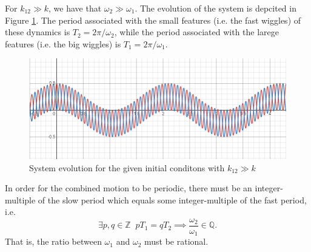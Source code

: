 \documentclass[12pt]{article}
\begin{document}
\begin{enumerate}[label=\roman*.]
    For $k_{12} \gg k$, we have that $\omega_2 \gg \omega_1$. The evolution of the system is depcited in Figure \ref{fig2}. The period associated with the small features (i.e. the fast wiggles) of these dynamics is $\boxed{T_2 = 2\pi/\omega_2}$, while the period associated with the larege features (i.e. the big wiggles) is $\boxed{T_1 = 2\pi/\omega_1}$.
    \begin{figure}[H]
        \includegraphics[scale=0.6]{fig2}
        \centering
        \caption{System evolution for the given initial conditons with $k_{12} \gg k$}
        \label{fig2}
    \end{figure}

    In order for the combined motion to be periodic, there must be an integer-multiple of the slow period which equals some integer-multiple of the fast period, i.e.
    \[ \exists p,q \in \mathbb{Z} \;\; pT_1 = qT_2 \implies \boxed{\frac{\omega_2}{\omega_1} \in \mathbb{Q}}. \]
    That is, the ratio between $\omega_1$ and $\omega_2$ must be rational.


\end{enumerate}
\end{document}
